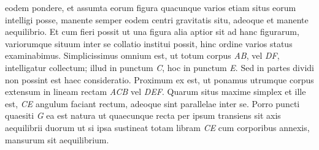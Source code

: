 eodem pondere,
et assumta eorum figura 
quacunque varios etiam situs eorum intelligi posse, 
manente semper eodem centri gravitatis situ, 
adeoque et manente aequilibrio. Et cum fieri possit ut una figura alia aptior sit ad hanc 
figurarum, variorumque situum inter se collatio institui possit, hinc ordine varios status examinabimus. 
\pend
\pstart
Simplicissimus omnium est, ut totum corpus \textit{AB}, vel \textit{DF}, intelligatur collectum; illud in punctum \textit{C}, hoc in punctum \textit{E}. 
\pend
\pstart
Sed 
in partes dividi non possint 
est haec consideratio. Proximum ex 
est, ut ponamus utrumque corpus extensum in lineam rectam \textit{ACB} vel \textit{DEF}. Quarum situs maxime simplex et ille est,
\textit{CE} angulum faciant rectum, adeoque sint parallelae inter 
%
%
se. 
\pend
\pstart
Porro
puncti quaesiti \textit{G} ea est natura\bracks{,} 
ut quaecunque recta per ipsum transiens sit axis aequilibrii
duorum 
ut si ipsa sustineat totam libram \textit{CE} cum corporibus annexis, mansurum sit aequilibrium. %
